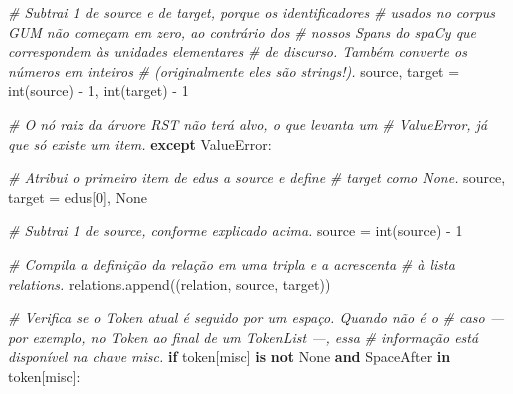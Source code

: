 \documentclass[
  brazilian,
]{article}
\newenvironment{Shaded}{}{}
\newcommand{\BuiltInTok}[1]{#1}
\newcommand{\CommentTok}[1]{\textcolor[rgb]{0.38,0.63,0.69}{\textit{#1}}}
\newcommand{\ControlFlowTok}[1]{\textcolor[rgb]{0.00,0.44,0.13}{\textbf{#1}}}
\newcommand{\DecValTok}[1]{\textcolor[rgb]{0.25,0.63,0.44}{#1}}
\newcommand{\KeywordTok}[1]{\textcolor[rgb]{0.00,0.44,0.13}{\textbf{#1}}}
\newcommand{\NormalTok}[1]{#1}
\newcommand{\OperatorTok}[1]{\textcolor[rgb]{0.40,0.40,0.40}{#1}}
\newcommand{\PreprocessorTok}[1]{\textcolor[rgb]{0.74,0.48,0.00}{#1}}
\newcommand{\StringTok}[1]{\textcolor[rgb]{0.25,0.44,0.63}{#1}}
\newcommand{\VariableTok}[1]{\textcolor[rgb]{0.10,0.09,0.49}{#1}}
\begin{document}
\begin{Shaded}
\begin{Highlighting}[]
                \CommentTok{\# Subtrai 1 de \textquotesingle{}source\textquotesingle{} e de \textquotesingle{}target\textquotesingle{}, porque os identificadores}
                \CommentTok{\# usados no corpus GUM não começam em zero, ao contrário dos}
                \CommentTok{\# nossos Spans do spaCy que correspondem às unidades elementares}
                \CommentTok{\# de discurso. Também converte os números em inteiros}
                \CommentTok{\# (originalmente eles são strings!).}
\NormalTok{                source, target }\OperatorTok{=} \BuiltInTok{int}\NormalTok{(source) }\OperatorTok{{-}} \DecValTok{1}\NormalTok{, }\BuiltInTok{int}\NormalTok{(target) }\OperatorTok{{-}} \DecValTok{1}
            
            \CommentTok{\# O nó raiz da árvore RST não terá alvo, o que levanta um}
            \CommentTok{\# ValueError, já que só existe um item.}
            \ControlFlowTok{except} \PreprocessorTok{ValueError}\NormalTok{:}
                
                \CommentTok{\# Atribui o primeiro item de \textquotesingle{}edus\textquotesingle{} a \textquotesingle{}source\textquotesingle{} e define}
                \CommentTok{\# \textquotesingle{}target\textquotesingle{} como None.}
\NormalTok{                source, target }\OperatorTok{=}\NormalTok{ edus[}\DecValTok{0}\NormalTok{], }\VariableTok{None}
                
                \CommentTok{\# Subtrai 1 de \textquotesingle{}source\textquotesingle{}, conforme explicado acima.}
\NormalTok{                source }\OperatorTok{=} \BuiltInTok{int}\NormalTok{(source) }\OperatorTok{{-}} \DecValTok{1} 
                
            \CommentTok{\# Compila a definição da relação em uma tripla e a acrescenta}
            \CommentTok{\# à lista \textquotesingle{}relations\textquotesingle{}.}
\NormalTok{            relations.append((relation, source, target))}
            
        \CommentTok{\# Verifica se o Token atual é seguido por um espaço. Quando não é o}
        \CommentTok{\# caso — por exemplo, no Token ao final de um TokenList —, essa}
        \CommentTok{\# informação está disponível na chave \textquotesingle{}misc\textquotesingle{}.}
        \ControlFlowTok{if}\NormalTok{ token[}\StringTok{\textquotesingle{}misc\textquotesingle{}}\NormalTok{] }\KeywordTok{is} \KeywordTok{not} \VariableTok{None} \KeywordTok{and} \StringTok{\textquotesingle{}SpaceAfter\textquotesingle{}} \KeywordTok{in}\NormalTok{ token[}\StringTok{\textquotesingle{}misc\textquotesingle{}}\NormalTok{]:}
            

\end{Highlighting}
\end{Shaded}
\end{document}
